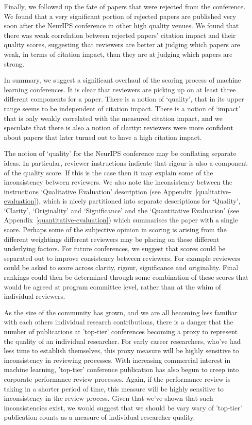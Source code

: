 \documentclass[twoside]{article}
\begin{document}
Finally, we followed up the fate of papers that were rejected from the
conference. We found that a very significant portion of rejected
papers are published very soon after the NeurIPS conference in other
high quality venues. We found that there was weak correlation between rejected papers' citation impact and their quality scores, suggesting that
reviewers are better at judging which papers are weak, in terms of
citation impact, than they are at judging which papers are strong.

In summary, we suggest a significant overhaul of the scoring process
of machine learning conferences. It is clear that reviewers are
picking up on at least three different components for a paper. There
is a notion of `quality', that in its upper range seems to be
independent of citation impact. There is a notion of `impact' that is
only weakly correlated with the measured citation impact, and we
speculate that there is also a notion of clarity: reviewers were more
confident about papers that later turned out to have a high citation
impact.

The notion of `quality' for the NeurIPS conference may be conflating
separate ideas. In particular, reviewer instructions indicate that
rigour is also a component of the quality score. If this is the case
then it may explain some of the inconsistency between
reviewers. We also note the inconsistency between the instructions `Qualitative Evaluation' description (see Appendix~\ref{qualitative-evaluation}), which is nicely partitioned into separate descriptions for `Quality', `Clarity', `Originality' and `Significance' and the `Quantitative Evaluation' (see Appendix~\ref{quantitative-evaluation}) which summarises the paper with a single score. Perhaps some of the subjective opinion in scoring is arising
from the different weightings different reviewers may be placing on
these different underlying factors. For future conferences, we suggest that scores
could be separated out to improve consistency between reviewers. For
example reviewers could be asked to score across clarity, rigour,
significance and originality. Final rankings could then be determined
through some combination of these scores that would be agreed at
program committee level, rather than at the whim of individual
reviewers.

As the size of the community has grown, and we are all becoming less familiar with each others individual research contributions, there is a danger that the number of publications at 'top-tier' conferences becoming a proxy to represent the quality of an individual researcher. For early career researchers, who've had less time to establish themselves, this proxy measure will be highly sensitive to inconsistency in reviewing processes. With increasing commercial interest in machine learning, 'top-tier' conference publication has also begun to creep into corporate performance review processes. Again, if the performance review is taking in a shorter period of time, this measure will be highly sensitive to inconsistency in the review process. Given that we've shown that such inconsistencies exist, we would suggest that we should be vary wary of 'top-tier' publication counts as a measure of individual researcher quality.
\end{document}
